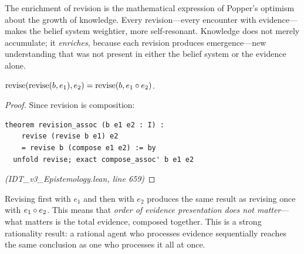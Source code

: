 \begin{interpretation}
The enrichment of revision is the mathematical expression of Popper's
optimism about the growth of knowledge. Every revision---every encounter with
evidence---makes the belief system weightier, more self-resonant. Knowledge does
not merely accumulate; it \emph{enriches}, because each revision produces
emergence---new understanding that was not present in either the belief system
or the evidence alone.
\end{interpretation}

\begin{theorem}
\label{thm:revision-assoc}
$\mathrm{revise}(\mathrm{revise}(b, e_1), e_2) = \mathrm{revise}(b, e_1 \circ e_2)$.
\end{theorem}

\begin{proof}
Since revision is composition:
\begin{lstlisting}
theorem revision_assoc (b e1 e2 : I) :
    revise (revise b e1) e2
    = revise b (compose e1 e2) := by
  unfold revise; exact compose_assoc' b e1 e2
\end{lstlisting}
\textit{(IDT\_v3\_Epistemology.lean, line 659)}
\end{proof}

\begin{interpretation}
Revising first with $e_1$ and then with $e_2$ produces the same result as
revising once with $e_1 \circ e_2$. This means that \emph{order of evidence
presentation does not matter}---what matters is the total evidence, composed
together. This is a strong rationality result: a rational agent who processes
evidence sequentially reaches the same conclusion as one who processes it all
at once.
\end{interpretation}

